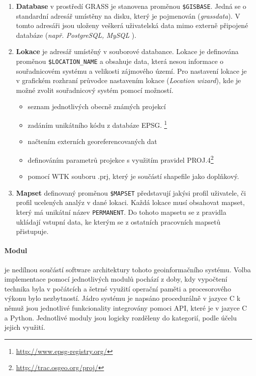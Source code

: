 \documentclass[a4paper,12pt]{article}
\begin{document}
\begin{enumerate}
\item \textbf{Database} v prostředí GRASS je stanovena proměnou \texttt{\$GISBASE}. Jedná se o standardní adresář umístěny na disku, který je pojmenován (\textit{grassdata}). V tomto adresáři jsou uloženy veškerá uživatelská data mimo externě připojené databáze (\textit{např. PostgreSQL, MySQL }).

\item \textbf{Lokace} je adresář umístěný v souborové databance. Lokace je definována proměnou   \texttt{\$LOCATION\_NAME}
a obsahuje data, která nesou informace o souřadnicovém systému a velikosti zájmového území. Pro nastavení lokace je v grafickém rozhraní průvodce nastavením lokace (\textit{Location wizard}), kde je možné zvolit souřadnicový systém pomocí možností.
\begin{itemize}
\item seznam jednotlivých obecně známých projekcí 
\item zadáním unikátního kódu z databáze \acs{EPSG}. \footnote{\url{http://www.epsg-registry.org/}}
\item načtením externích georeferencovaných dat
\item definováním parametrů projekce s využitím pravidel PROJ.4\footnote{\url{http://trac.osgeo.org/proj/}}
\item pomocí \ac{WTK} souboru .prj, který je součástí shapefile jako doplňkový.
\end{itemize}

\item \textbf{Mapset} definovaný proměnou \texttt{\$MAPSET} představují jakýsi profil uživatele, či profil ucelených analýz  v dané lokaci. Každá lokace musí obsahovat mapset, který má unikátní název \texttt{PERMANENT}. Do tohoto mapsetu se z pravidla ukládají vstupní data, ke kterým se z ostatních pracovních mapsetů přistupuje.
\end{enumerate}

\paragraph*{Modul} je nedílnou součástí software architektury tohoto geoinformačního systému. Volba implementace pomocí jednotlivých modulů pochází z doby, kdy vypočtení technika byla v počátcích a šetrné využití operační paměti a procesorového výkonu bylo nezbytností. Jádro systému je napsáno procedurálně v jazyce C k němuž jsou  jednotlivé funkcionality integrovány pomoci \acs{API}, které je v jazyce C a Python. Jednotlivé moduly jsou logicky rozděleny do kategorií, podle účelu jejich využití.
\end{document}
